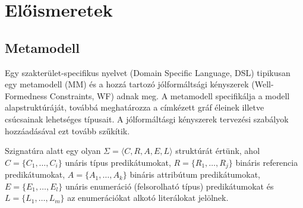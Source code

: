 \chapter{Előismeretek}

\section{Metamodell}

Egy szakterület-specifikus nyelvet (Domain Specific Language, DSL) tipikusan egy metamodell (MM) és a hozzá tartozó jólformáltsági kényszerek (Well-Formedness Constraints, WF) adnak meg. A metamodell specifikálja a modell alapstruktúráját, továbbá meghatározza a címkézett gráf  éleinek illetve csúcsainak lehetséges típusait. A jólformáltásgi kényszerek tervezési szabályok hozzáadásával ezt tovább szűkítik.

\begin{definition}[Szignatúra]
Szignatúra alatt egy olyan $\Sigma = \langle\mathit{C}, \mathit{R}, \mathit{A}, \mathit{E}, \mathit{L}\rangle$ struktúrát értünk, ahol $C = \{C_1, \ldots, C_i\}$ unáris típus predikátumokat, $R = \{R_1, \ldots, R_j\}$ bináris referencia predikátumokat, $A = \{A_1, \ldots, A_k\}$ bináris attribútum predikátumokat, $E = \{E_1, \ldots, E_l\}$ unáris enumeráció (felsorolható típus) predikátumokat és $L = \{L_1, \ldots, L_m\}$ az enumerációkat alkotó literálokat jelölnek.
\end{definition}


